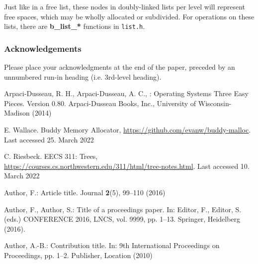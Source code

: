\documentclass[runningheads]{llncs}
\begin{document}
Just like in a free list, these nodes in doubly-linked lists per level will 
represent free spaces, which may be wholly allocated or subdivided.
For operations on these lists, there are \textbf{b\_list\_*} functions in 
\texttt{list.h}.

\subsubsection{Acknowledgements} Please place your acknowledgments at
the end of the paper, preceded by an unnumbered run-in heading (i.e.
3rd-level heading).

%
%

 
\newpage

\begin{thebibliography}{8}

Arpaci-Dusseau, R. H., Arpaci-Dusseau, A. C., : Operating Systems Three Easy Pieces. Version 0.80. Arpaci-Dusseau Books, Inc.,
University of Wisconsin-Madison (2014)

E. Wallace. Buddy Memory Allocator, \url{https://github.com/evanw/buddy-malloc}. Last accessed 25.
March 2022

C. Riesbeck. EECS 311: Trees, \url{https://courses.cs.northwestern.edu/311/html/tree-notes.html}. Last accessed 10. March 2022

Author, F.: Article title. Journal \textbf{2}(5), 99--110 (2016)

Author, F., Author, S.: Title of a proceedings paper. In: Editor,
F., Editor, S. (eds.) CONFERENCE 2016, LNCS, vol. 9999, pp. 1--13.
Springer, Heidelberg (2016). 

Author, A.-B.: Contribution title. In: 9th International Proceedings
on Proceedings, pp. 1--2. Publisher, Location (2010)
\end{thebibliography}
\end{document}
